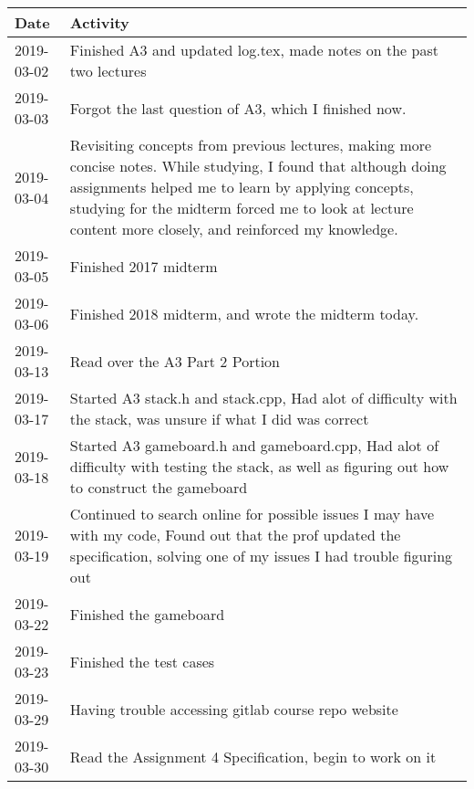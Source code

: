 \documentclass[12pt]{article}
\begin{document}
 \begin{tabular}{|p{2cm}| p{12cm}|} 
 \hline
 Date & Activity  \\ 
 
 \hline
        2019-03-02 & Finished A3 and updated log.tex, made notes on the past two lectures \\
 \hline
         2019-03-03 & Forgot the last question of A3, which I finished now. \\
 \hline
          2019-03-04 & Revisiting concepts from previous lectures, making more concise notes. While studying, I found that although doing assignments helped me to learn by applying concepts, studying for the midterm forced me to look at lecture content more closely, and reinforced my knowledge.  \\
 \hline
    2019-03-05 & Finished 2017 midterm  \\
 \hline
    2019-03-06 & Finished 2018 midterm, and wrote the midterm today.  \\
 \hline
     2019-03-13 & Read over the A3 Part 2 Portion  \\
 \hline
     2019-03-17 & Started A3 stack.h and stack.cpp, Had alot of difficulty with the stack, was unsure if what I did was correct \\
 \hline
      2019-03-18 & Started A3 gameboard.h and gameboard.cpp, Had alot of difficulty with testing the stack, as well as figuring out how to construct the gameboard \\
 \hline	
       2019-03-19 & Continued to search online for possible issues I may have with my code, Found out that the prof updated the specification, solving one of my issues I had trouble figuring out \\
 \hline	
        2019-03-22 & Finished the gameboard \\
 \hline	
         2019-03-23 & Finished the test cases \\
 \hline	
          2019-03-29 & Having trouble accessing gitlab course repo website \\
 \hline	
           2019-03-30 & Read the Assignment 4 Specification, begin to work on it \\
 \hline	
\end{tabular}
\end{document}
